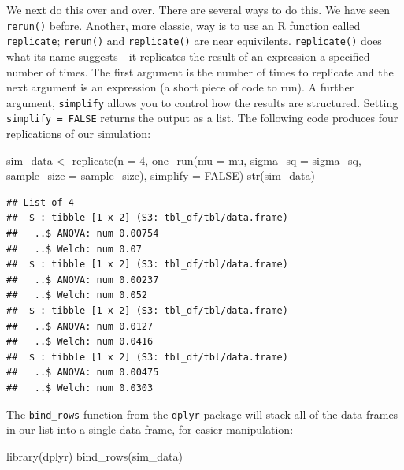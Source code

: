 \documentclass[
]{book}
\newenvironment{Shaded}{\begin{snugshade}}{\end{snugshade}}
\newcommand{\AttributeTok}[1]{\textcolor[rgb]{0.77,0.63,0.00}{#1}}
\newcommand{\ConstantTok}[1]{\textcolor[rgb]{0.00,0.00,0.00}{#1}}
\newcommand{\DecValTok}[1]{\textcolor[rgb]{0.00,0.00,0.81}{#1}}
\newcommand{\FunctionTok}[1]{\textcolor[rgb]{0.00,0.00,0.00}{#1}}
\newcommand{\NormalTok}[1]{#1}
\newcommand{\OtherTok}[1]{\textcolor[rgb]{0.56,0.35,0.01}{#1}}
\begin{document}
We next do this over and over.
There are several ways to do this.
We have seen \texttt{rerun()} before.
Another, more classic, way is to use an R function called \texttt{replicate}; \texttt{rerun()} and \texttt{replicate()} are near equivilents.
\texttt{replicate()} does what its name suggests---it replicates the result of an expression a specified number of times. The first argument is the number of times to replicate and the next argument is an expression (a short piece of code to run). A further argument, \texttt{simplify} allows you to control how the results are structured. Setting \texttt{simplify\ =\ FALSE} returns the output as a list. The following code produces four replications of our simulation:

\begin{Shaded}
\begin{Highlighting}[]
\NormalTok{sim\_data }\OtherTok{\textless{}{-}} \FunctionTok{replicate}\NormalTok{(}\AttributeTok{n =} \DecValTok{4}\NormalTok{,}
                      \FunctionTok{one\_run}\NormalTok{(}\AttributeTok{mu =}\NormalTok{ mu, }\AttributeTok{sigma\_sq =}\NormalTok{ sigma\_sq,}
                              \AttributeTok{sample\_size =}\NormalTok{ sample\_size),}
                      \AttributeTok{simplify =} \ConstantTok{FALSE}\NormalTok{)}
\FunctionTok{str}\NormalTok{(sim\_data)}
\end{Highlighting}
\end{Shaded}

\begin{verbatim}
## List of 4
##  $ : tibble [1 x 2] (S3: tbl_df/tbl/data.frame)
##   ..$ ANOVA: num 0.00754
##   ..$ Welch: num 0.07
##  $ : tibble [1 x 2] (S3: tbl_df/tbl/data.frame)
##   ..$ ANOVA: num 0.00237
##   ..$ Welch: num 0.052
##  $ : tibble [1 x 2] (S3: tbl_df/tbl/data.frame)
##   ..$ ANOVA: num 0.0127
##   ..$ Welch: num 0.0416
##  $ : tibble [1 x 2] (S3: tbl_df/tbl/data.frame)
##   ..$ ANOVA: num 0.00475
##   ..$ Welch: num 0.0303
\end{verbatim}

The \texttt{bind\_rows} function from the \texttt{dplyr} package will stack all of the data frames in our list into a single data frame, for easier manipulation:

\begin{Shaded}
\begin{Highlighting}[]
\FunctionTok{library}\NormalTok{(dplyr)}
\FunctionTok{bind\_rows}\NormalTok{(sim\_data)}
\end{Highlighting}
\end{Shaded}
\end{document}

